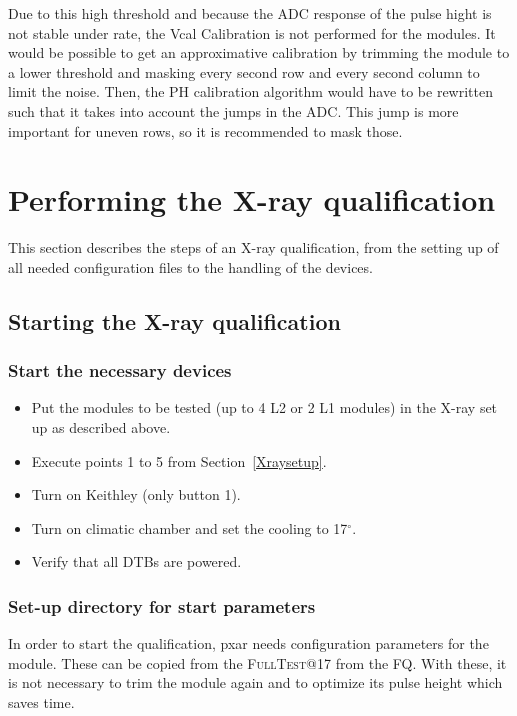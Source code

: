 \documentclass[a4paper,12pt,twoside]{article}
\newcommand{\testname}[1]{{\color{Darkcyan} \textsc{#1}}}
\begin{document}
Due to this high threshold and because the ADC response of the pulse hight is not stable under rate, the Vcal Calibration is not performed for the modules. 
It would be possible to get an approximative calibration by trimming the module to a lower threshold and masking every second row and every second column to limit the noise. Then, the PH calibration algorithm would have to be rewritten such that it takes into account the jumps in the ADC. This jump is more important for uneven rows, so it is recommended to mask those.


\section{Performing the X-ray qualification}

This section describes the steps of an X-ray qualification, from the setting up of all needed configuration files to the handling of the devices. 

\subsection{Starting the X-ray qualification}

\subsubsection{Start the necessary devices}

\begin{itemize}
\item Put the modules to be tested (up to 4 L2 or 2 L1 modules) in the X-ray set up as described above.
\item Execute points 1 to 5 from Section~\ref{Xraysetup}.
\item Turn on Keithley (only button 1).
\item Turn on climatic chamber and set the cooling to 17$^{\circ}$.
\item Verify that all DTBs are powered.
\end{itemize}

\subsubsection{Set-up directory for start parameters}

In order to start the qualification, pxar needs configuration parameters for the module. These can be copied from the \testname{FullTest}@17 from the FQ. With these, it is not necessary to trim the module again and to optimize its pulse height which saves time.
\end{document}
